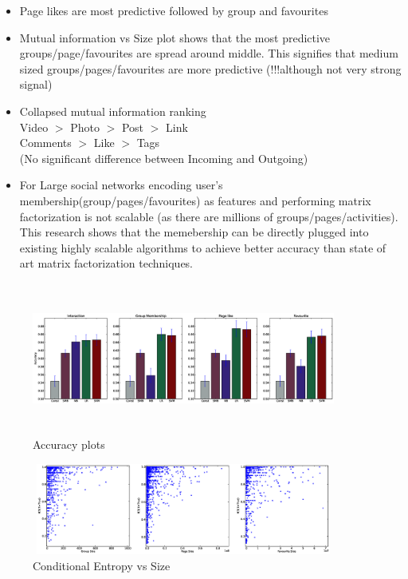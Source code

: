 \begin{itemize}
  \item Page likes are most predictive followed by group and favourites
  \item Mutual information vs Size plot shows that the most predictive groups/page/favourites are spread around middle. This signifies that medium sized groups/pages/favourites are more predictive (!!!although not very strong signal)
  \item Collapsed mutual information ranking \\Video $>$ Photo $>$ Post $>$ Link\\ Comments $>$ Like $>$ Tags\\
   (No significant difference between Incoming and Outgoing)
   \item For Large social networks encoding user's membership(group/pages/favourites) as features and performing matrix factorization is not scalable (as there are millions of groups/pages/activities). This research shows that the memebership can be directly plugged into existing highly scalable algorithms to achieve better accuracy than state of art matrix factorization techniques. 
\end{itemize}


\begin{figure}
\centering
\includegraphics[width=100mm, height=50mm]{data/accuracy.eps}
\caption{Accuracy plots}
\label{Fig: Accuracy}
\end{figure}

\begin{figure}
\centering
\includegraphics[width=100mm, height=30mm]{data/CEvsSize.eps}
\caption{Conditional Entropy vs Size}
\label{Fig: Conditional Entropy vs Size}
\end{figure}

